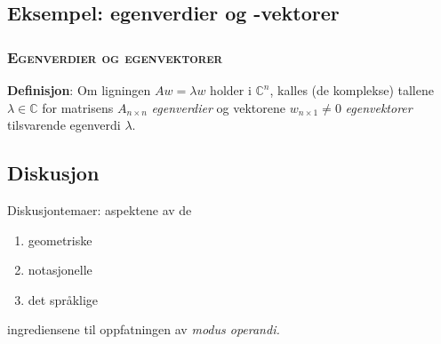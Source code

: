 \documentclass[xcolor=x11names,compress]{beamer}
\renewcommand{\(}{\begin{columns}}
\renewcommand{\)}{\end{columns}}
\newcommand{\<}[1]{\begin{column}{#1}}
\renewcommand{\>}{\end{column}}
\begin{document}
%
\begin{frame}
    \subsection{Eksempel: egenverdier og -vektorer}
      \frametitle{\scshape Egenverdier og egenvektorer}
      {\bf Definisjon}: Om ligningen $A w = \lambda w$ holder i $\mathbb{C}^n$, kalles (de komplekse)
       tallene $\lambda \in \mathbb{C}$
       for   matrisens $A_{\scriptscriptstyle n\times n}$ {\it egenverdier} og  vektorene $w_{\scriptscriptstyle n\times 1} \ne 0$  {\it egenvektorer}
       tilsvarende egenverdi $\lambda$.
\end{frame}
%
%
\begin{frame}
    \subsection{Diskusjon}
   Diskusjontemaer: aspektene av de
   \begin{enumerate}
   \item geometriske
   \item notasjonelle
   \item det språklige
   \end{enumerate}   
   ingrediensene til oppfatningen av {\it modus operandi.}
\end{frame}
%
\end{document}

